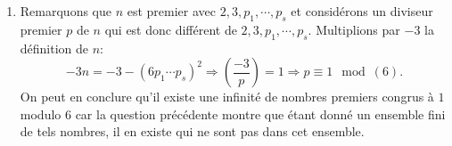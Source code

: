 \begin{enumerate}
\begin{enumerate}
    \item Remarquons que $n$ est premier avec $2, 3, p_1, \cdots, p_s$ et considérons un diviseur premier $p$ de $n$ qui est donc différent de $2, 3, p_1, \cdots, p_s$. Multiplions par $-3$ la définition de $n$:
\[
  -3n = -3 - (6p_1\cdots p_s)^2 \Rightarrow \left(\frac{-3}{p}\right) = 1 \Rightarrow p \equiv 1 \mod (6).
\]
On peut en conclure qu'il existe une infinité de nombres premiers congrus à $1$ modulo $6$ car la question précédente montre que étant donné un ensemble fini de tels nombres, il en existe qui ne sont pas dans cet ensemble.
  \end{enumerate}

\end{enumerate}

